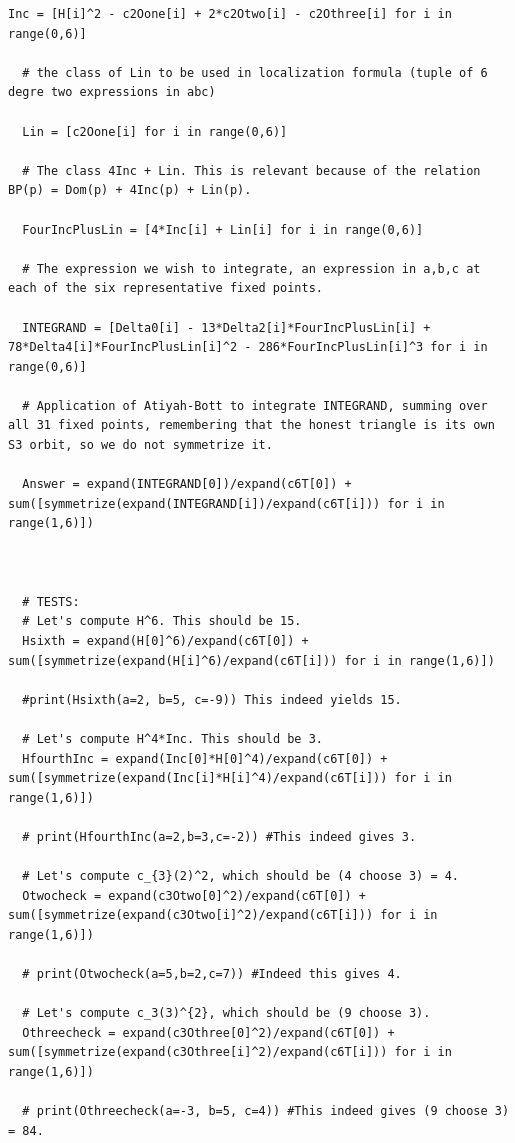 \documentclass[reqno, 11pt]{amsart}
\theoremstyle{plain}
\theoremstyle{remark}
\begin{document}
\begin{lstlisting}[basicstyle=\ttfamily\tiny]
  Inc = [H[i]^2 - c2Oone[i] + 2*c2Otwo[i] - c2Othree[i] for i in range(0,6)]
  
  # the class of Lin to be used in localization formula (tuple of 6 degre two expressions in abc)
  
  Lin = [c2Oone[i] for i in range(0,6)]
  
  # The class 4Inc + Lin. This is relevant because of the relation BP(p) = Dom(p) + 4Inc(p) + Lin(p).
  
  FourIncPlusLin = [4*Inc[i] + Lin[i] for i in range(0,6)]
  
  # The expression we wish to integrate, an expression in a,b,c at each of the six representative fixed points.
  
  INTEGRAND = [Delta0[i] - 13*Delta2[i]*FourIncPlusLin[i] + 78*Delta4[i]*FourIncPlusLin[i]^2 - 286*FourIncPlusLin[i]^3 for i in range(0,6)]
  
  # Application of Atiyah-Bott to integrate INTEGRAND, summing over all 31 fixed points, remembering that the honest triangle is its own S3 orbit, so we do not symmetrize it.  
  
  Answer = expand(INTEGRAND[0])/expand(c6T[0]) + sum([symmetrize(expand(INTEGRAND[i])/expand(c6T[i])) for i in range(1,6)])
  
  
  
  # TESTS: 
  # Let's compute H^6. This should be 15.
  Hsixth = expand(H[0]^6)/expand(c6T[0]) + sum([symmetrize(expand(H[i]^6)/expand(c6T[i])) for i in range(1,6)])
  
  #print(Hsixth(a=2, b=5, c=-9)) This indeed yields 15.
  
  # Let's compute H^4*Inc. This should be 3. 
  HfourthInc = expand(Inc[0]*H[0]^4)/expand(c6T[0]) + sum([symmetrize(expand(Inc[i]*H[i]^4)/expand(c6T[i])) for i in range(1,6)])
  
  # print(HfourthInc(a=2,b=3,c=-2)) #This indeed gives 3.
  
  # Let's compute c_{3}(2)^2, which should be (4 choose 3) = 4. 
  Otwocheck = expand(c3Otwo[0]^2)/expand(c6T[0]) + sum([symmetrize(expand(c3Otwo[i]^2)/expand(c6T[i])) for i in range(1,6)])
  
  # print(Otwocheck(a=5,b=2,c=7)) #Indeed this gives 4.
  
  # Let's compute c_3(3)^{2}, which should be (9 choose 3).
  Othreecheck = expand(c3Othree[0]^2)/expand(c6T[0]) + sum([symmetrize(expand(c3Othree[i]^2)/expand(c6T[i])) for i in range(1,6)])
  
  # print(Othreecheck(a=-3, b=5, c=4)) #This indeed gives (9 choose 3) = 84.
  

\end{lstlisting}
\end{document}
